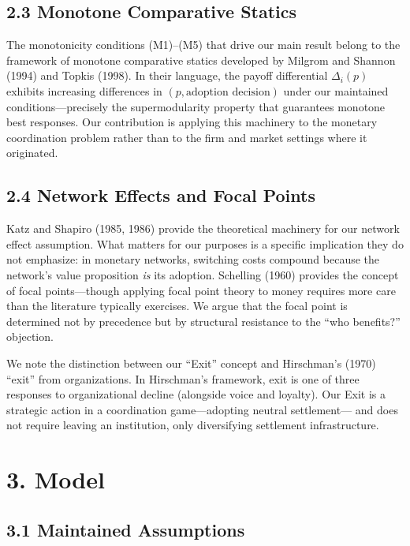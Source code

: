 \documentclass[12pt]{article}
\theoremstyle{definition}
\theoremstyle{remark}
\begin{document}
\subsection{2.3 Monotone Comparative Statics}

The monotonicity conditions (M1)--(M5) that drive our main result belong
to the framework of monotone comparative statics developed by Milgrom
and Shannon (1994) and Topkis (1998). In their language, the payoff
differential $\Delta_i(p)$ exhibits increasing differences in $(p, \text{adoption decision})$ under our maintained conditions---precisely the
supermodularity property that guarantees monotone best responses. Our
contribution is applying this machinery to the monetary coordination
problem rather than to the firm and market settings where it originated.

\subsection{2.4 Network Effects and Focal Points}

Katz and Shapiro (1985, 1986) provide the theoretical machinery for our
network effect assumption. What matters for our purposes is a specific
implication they do not emphasize: in monetary networks, switching costs
compound because the network's value proposition \emph{is} its adoption.
Schelling (1960) provides the concept of focal points---though applying
focal point theory to money requires more care than the literature
typically exercises. We argue that the focal point is determined not by
precedence but by structural resistance to the ``who benefits?'' objection.

We note the distinction between our ``Exit'' concept and Hirschman's (1970)
``exit'' from organizations. In Hirschman's framework, exit is one of three
responses to organizational decline (alongside voice and loyalty). Our Exit
is a strategic action in a coordination game---adopting neutral settlement---
and does not require leaving an institution, only diversifying settlement
infrastructure.


\section{3. Model}

\subsection{3.1 Maintained Assumptions}
\end{document}
